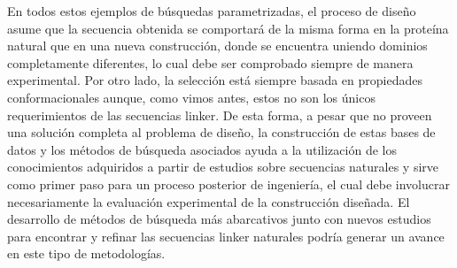 En todos estos ejemplos de búsquedas parametrizadas, el proceso de diseño asume que la secuencia 
obtenida se comportará de la misma forma en la proteína natural que en una nueva construcción, donde se encuentra uniendo dominios completamente diferentes, lo cual debe ser comprobado siempre de manera experimental.
Por otro lado, la selección está siempre basada en propiedades conformacionales aunque, como vimos antes, estos no son los únicos requerimientos de las secuencias linker.
De esta forma, a pesar que no proveen una solución completa al problema de diseño, la construcción de estas bases de datos y los métodos de búsqueda asociados 
ayuda a la utilización de los conocimientos adquiridos a partir de estudios sobre secuencias naturales y sirve como primer paso para un proceso posterior de ingeniería, 
el cual debe involucrar necesariamente la evaluación experimental de la construcción diseñada.
El desarrollo de métodos de búsqueda más abarcativos junto con nuevos estudios para encontrar y refinar las secuencias linker naturales podría generar un avance en este tipo de metodologías.








































